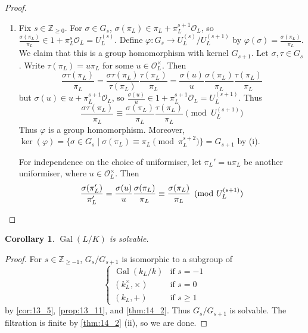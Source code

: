 \documentclass[11pt]{article}
\theoremstyle{definition}
\theoremstyle{plain}
\newtheorem{corollary}[definition]{Corollary}
\theoremstyle{remark}
\DeclareMathOperator{\Gal}{Gal}
\newcommand{\ZZ}{\mathbb{Z}}
\newcommand{\cO}{\mathcal{O}}
\begin{document}
\begin{proof}
\begin{enumerate}
        \item Fix $s \in \ZZ_{\ge 0}$. For $\sigma \in G_s$, $\sigma(\pi_L) \in \pi_L + \pi_L^{s+1} \cO_L$, so $\frac{\sigma(\pi_L)}{\pi_L} \in 1 + \pi_L^s \cO_L = U_L^{(s)}$. Define $\varphi : G_s \to U_L^{(s)} / U_L^{(s+1)}$ by $\varphi(\sigma) = \frac{\sigma(\pi_L)}{\pi_L}$. We claim that this is a group homomorphism with kernel $G_{s+1}$. Let $\sigma, \tau \in G_s$. Write $\tau(\pi_L) = u \pi_L$ for some $u \in \cO_L^\times$. Then
            \begin{equation*}
                \frac{\sigma\tau(\pi_L)}{\pi_L} = \frac{\sigma\tau(\pi_L)}{\tau(\pi_L)} \frac{\tau(\pi_L)}{\pi_L} = \frac{\sigma(u)}{u} \frac{\sigma(\pi_L)}{\pi_L} \frac{\tau(\pi_L)}{\pi_L}
            \end{equation*}
            but $\sigma(u) \in u + \pi_L^{s+1} \cO_L$, so $\frac{\sigma(u)}{u} \in 1 + \pi_L^{s+1} \cO_L = U_L^{(s+1)}$. Thus
            \begin{equation*}
                \frac{\sigma\tau(\pi_L)}{\pi_L} \equiv \frac{\sigma(\pi_L)}{\pi_L} \frac{\tau(\pi_L)}{\pi_L} \pmod{U_L^{(s+1)}}
            \end{equation*}
            Thus $\varphi$ is a group homomorphism. Moreover, $\ker(\varphi) = \{\sigma \in G_s \mid \sigma(\pi_L) \equiv \pi_L \pmod{\pi_L^{s+2}}\} = G_{s+1}$ by (i).

            For independence on the choice of uniformiser, let $\pi_L' = u \pi_L$ be another uniformiser, where $u \in \cO_L^\times$. Then
            \begin{equation*}
                \frac{\sigma(\pi_L')}{\pi_L'} = \frac{\sigma(u)}{u} \frac{\sigma(\pi_L)}{\pi_L} \equiv \frac{\sigma(\pi_L)}{\pi_L} \pmod{U_L^{(s+1)}}
                \qedhere
            \end{equation*}
    \end{enumerate}
\end{proof}

\begin{corollary}\label{cor:14_3}
    $\Gal(L/K)$ is solvable.
\end{corollary}
\begin{proof}
    For $s \in \ZZ_{\ge -1}$, $G_s / G_{s+1}$ is isomorphic to a subgroup of
    \begin{equation*}
        \begin{cases}
            \Gal(k_L/k) & \text{if } s = -1\\
            (k_L^\times, \times) & \text{if } s = 0\\
            (k_L, +) & \text{if } s \ge 1
        \end{cases}
    \end{equation*}
    by \autoref{cor:13_5}, \autoref{prop:13_11}, and \autoref{thm:14_2}. Thus $G_s / G_{s+1}$ is solvable. The filtration is finite by \autoref{thm:14_2} (ii), so we are done.
\end{proof}
\end{document}
